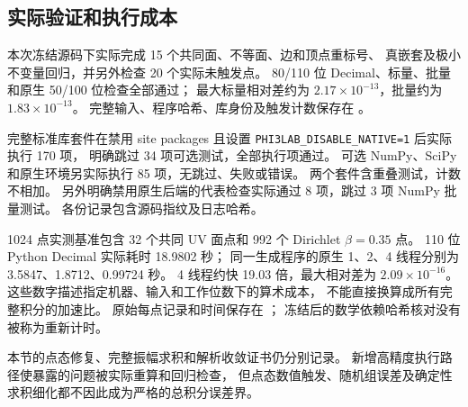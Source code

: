 \subsection{实际验证和执行成本}

本次冻结源码下实际完成 15 个共同面、不等面、边和顶点重标号、
真嵌套及极小不变量回归，并另外检查 20 个实际未触发点。
80/110 位 Decimal、标量、批量和原生 50/100 位检查全部通过；
最大标量相对差约为 $2.17\times10^{-13}$，批量约为 $1.83\times10^{-13}$。
完整输入、程序哈希、库身份及触发计数保存在
。

完整标准库套件在禁用 site packages 且设置
\texttt{PHI3LAB\_DISABLE\_NATIVE=1} 后实际执行 170 项，
明确跳过 34 项可选测试，全部执行项通过。
可选 NumPy、SciPy 和原生环境另实际执行 85 项，无跳过、失败或错误。
两个套件含重叠测试，计数不相加。
另外明确禁用原生后端的代表检查实际通过 8 项，跳过 3 项 NumPy 批量测试。
各份记录包含源码指纹及日志哈希。

1024 点实测基准包含 32 个共同 UV 面点和 992 个 Dirichlet $\beta=0.35$ 点。
110 位 Python Decimal 实际耗时 18.9802 秒；
同一生成程序的原生 1、2、4 线程分别为 3.5847、1.8712、0.99724 秒。
4 线程约快 19.03 倍，最大相对差为 $2.09\times10^{-16}$。
这些数字描述指定机器、输入和工作位数下的算术成本，
不能直接换算成所有完整积分的加速比。
原始每点记录和时间保存在 ；
冻结后的数学依赖哈希核对没有被称为重新计时。

本节的点态修复、完整振幅求积和解析收敛证书仍分别记录。
新增高精度执行路径使暴露的问题被实际重算和回归检查，
但点态数值触发、随机组误差及确定性求积细化都不因此成为严格的总积分误差界。
